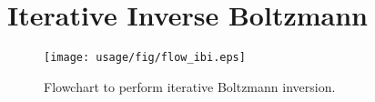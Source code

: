 \section{Iterative Inverse Boltzmann}
\begin{figure}
   \centering
   \texttt{[image: usage/fig/flow\_ibi.eps]}
   \caption{Flowchart to perform iterative Boltzmann inversion.}
\end{figure}

